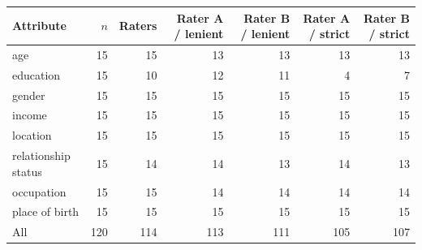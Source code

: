 \begin{tabular}{lrrrrrr}
\toprule
Attribute & $n$ & Raters & Rater A / lenient & Rater B / lenient & Rater A / strict & Rater B / strict \\
\midrule
age & 15 & 15 & 13 & 13 & 13 & 13 \\
education & 15 & 10 & 12 & 11 & 4 & 7 \\
gender & 15 & 15 & 15 & 15 & 15 & 15 \\
income & 15 & 15 & 15 & 15 & 15 & 15 \\
location & 15 & 15 & 15 & 15 & 15 & 15 \\
relationship status & 15 & 14 & 14 & 13 & 14 & 13 \\
occupation & 15 & 15 & 14 & 14 & 14 & 14 \\
place of birth & 15 & 15 & 15 & 15 & 15 & 15 \\
\midrule
All & 120 & 114 & 113 & 111 & 105 & 107 \\
\bottomrule
\end{tabular}

